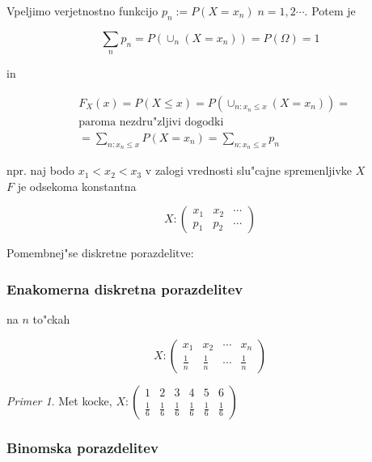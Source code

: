 \documentclass[a4paper,12pt]{article}
\theoremstyle{definition}
\theoremstyle{remark}
\newtheorem*{ex}{Primer}
\begin{document}
Vpeljimo verjetnostno funkcijo $p_n := P(X = x_n) \; n = 1, 2 \cdots$. Potem je

\begin{equation*}
    \sum_n p_n = P(\cup_n (X = x_n)) = P(\Omega) = 1
\end{equation*}

in

\begin{align*}
    &F_X(x) = P(X \leq x) = P(\cup_{n: x_n \leq x} (X = x_n)) = \\
    &\text{paroma nezdru"zljivi dogodki} \\
    &= \sum_{n: x_n \leq x} P(X = x_n) = \sum_{n: x_n \leq x} p_n
\end{align*}

npr. naj bodo $x_1 < x_2 < x_3$ v zalogi vrednosti slu"cajne spremenljivke $X$ \\
$F$ je odsekoma konstantna

\begin{equation*}
    X: \begin{pmatrix}
        x_1 & x_2 & \cdots \\
        p_1 & p_2 & \cdots
    \end{pmatrix}
\end{equation*}

Pomembnej"se diskretne porazdelitve:

\subsubsection{Enakomerna diskretna porazdelitev} na $n$ to"ckah

\begin{equation*}
    X: \begin{pmatrix}
        x_1 & x_2 & \cdots & x_n \\
        \frac{1}{n} & \frac{1}{n} & \cdots & \frac{1}{n}
    \end{pmatrix}
\end{equation*}

\begin{ex}
    Met kocke, $X: \begin{pmatrix}
        1 & 2 & 3 & 4 & 5 & 6 \\
        \frac{1}{6} & \frac{1}{6} & \frac{1}{6} & \frac{1}{6} & \frac{1}{6} & \frac{1}{6}
    \end{pmatrix}$
\end{ex}

\subsubsection{Binomska porazdelitev}
\end{document}

